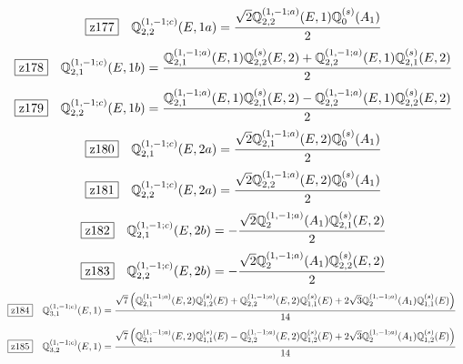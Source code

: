 \documentclass[fleqn,10pt,landscape]{jsarticle}
\begin{document}
\begin{dmath*}
\hspace*{3mm}\fbox{z177}\quad \mathbb{Q}_{2,2}^{(1,-1;c)}(E,1a)=\frac{\sqrt{2} \mathbb{Q}_{2,2}^{(1,-1;a)}(E,1) \mathbb{Q}_{0}^{(s)}(A_{1})}{2}
\end{dmath*}
\begin{dmath*}
\hspace*{3mm}\fbox{z178}\quad \mathbb{Q}_{2,1}^{(1,-1;c)}(E,1b)=\frac{\mathbb{Q}_{2,1}^{(1,-1;a)}(E,1) \mathbb{Q}_{2,2}^{(s)}(E,2) + \mathbb{Q}_{2,2}^{(1,-1;a)}(E,1) \mathbb{Q}_{2,1}^{(s)}(E,2)}{2}
\end{dmath*}
\begin{dmath*}
\hspace*{3mm}\fbox{z179}\quad \mathbb{Q}_{2,2}^{(1,-1;c)}(E,1b)=\frac{\mathbb{Q}_{2,1}^{(1,-1;a)}(E,1) \mathbb{Q}_{2,1}^{(s)}(E,2) - \mathbb{Q}_{2,2}^{(1,-1;a)}(E,1) \mathbb{Q}_{2,2}^{(s)}(E,2)}{2}
\end{dmath*}
\begin{dmath*}
\hspace*{3mm}\fbox{z180}\quad \mathbb{Q}_{2,1}^{(1,-1;c)}(E,2a)=\frac{\sqrt{2} \mathbb{Q}_{2,1}^{(1,-1;a)}(E,2) \mathbb{Q}_{0}^{(s)}(A_{1})}{2}
\end{dmath*}
\begin{dmath*}
\hspace*{3mm}\fbox{z181}\quad \mathbb{Q}_{2,2}^{(1,-1;c)}(E,2a)=\frac{\sqrt{2} \mathbb{Q}_{2,2}^{(1,-1;a)}(E,2) \mathbb{Q}_{0}^{(s)}(A_{1})}{2}
\end{dmath*}
\begin{dmath*}
\hspace*{3mm}\fbox{z182}\quad \mathbb{Q}_{2,1}^{(1,-1;c)}(E,2b)=- \frac{\sqrt{2} \mathbb{Q}_{2}^{(1,-1;a)}(A_{1}) \mathbb{Q}_{2,1}^{(s)}(E,2)}{2}
\end{dmath*}
\begin{dmath*}
\hspace*{3mm}\fbox{z183}\quad \mathbb{Q}_{2,2}^{(1,-1;c)}(E,2b)=- \frac{\sqrt{2} \mathbb{Q}_{2}^{(1,-1;a)}(A_{1}) \mathbb{Q}_{2,2}^{(s)}(E,2)}{2}
\end{dmath*}
\begin{dmath*}
\hspace*{3mm}\fbox{z184}\quad \mathbb{Q}_{3,1}^{(1,-1;c)}(E,1)=\frac{\sqrt{7} \left(\mathbb{Q}_{2,1}^{(1,-1;a)}(E,2) \mathbb{Q}_{1,2}^{(s)}(E) + \mathbb{Q}_{2,2}^{(1,-1;a)}(E,2) \mathbb{Q}_{1,1}^{(s)}(E) + 2 \sqrt{3} \mathbb{Q}_{2}^{(1,-1;a)}(A_{1}) \mathbb{Q}_{1,1}^{(s)}(E)\right)}{14}
\end{dmath*}
\begin{dmath*}
\hspace*{3mm}\fbox{z185}\quad \mathbb{Q}_{3,2}^{(1,-1;c)}(E,1)=\frac{\sqrt{7} \left(\mathbb{Q}_{2,1}^{(1,-1;a)}(E,2) \mathbb{Q}_{1,1}^{(s)}(E) - \mathbb{Q}_{2,2}^{(1,-1;a)}(E,2) \mathbb{Q}_{1,2}^{(s)}(E) + 2 \sqrt{3} \mathbb{Q}_{2}^{(1,-1;a)}(A_{1}) \mathbb{Q}_{1,2}^{(s)}(E)\right)}{14}
\end{dmath*}
\end{document}

